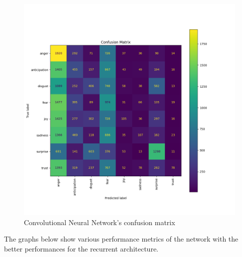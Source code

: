 \begin{figure}[H]
    \centering
    \includegraphics[width=0.8\linewidth]{pictures/cnn_confusion_matrix.png}
    \caption{Convolutional Neural Network's confusion matrix}
    \label{fig:cnn_confmatr}
\end{figure}

The graphs below show various performance metrics of the network with the better
performances for the recurrent architecture.


